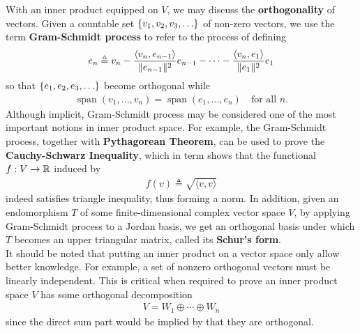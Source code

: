 \documentclass{report}
\begin{document}
With an inner product equipped on $V$, we may discuss the  \textbf{orthogonality} of vectors. Given a countable set  $\set{v_1,v_2,v_3,\dots }$ of non-zero vectors, we use the term \textbf{Gram-Schmidt process} to refer to the process of defining 
\begin{align*}
e_n \triangleq v_n - \frac{\langle v_{n},e_{n-1}\rangle }{\| e_{n-1} \|^2}e_{n-1} - \cdots - \frac{\langle v_n,e_1\rangle }{\| e_1 \|^2}e_1
\end{align*}
so that $\set{e_1,e_2,e_3,\dots}$ become orthogonal while 
\begin{align*}
\operatorname{span}(v_1,\dots ,v_n)=\operatorname{span}(e_1,\dots ,e_n)\quad\text{for all }n.
\end{align*}
Although implicit, Gram-Schmidt process may be considered one of the most important notions in inner product space. For example, the Gram-Schmidt process, together with \textbf{Pythagorean Theorem}, can be used to prove the \textbf{Cauchy-Schwarz Inequality}, which in term shows that the functional $f:V\rightarrow \mathbb{R}$ induced by 
\begin{align*}
f(v)\triangleq \sqrt{\langle v,v\rangle }  
\end{align*}
indeed satisfies triangle inequality, thus forming a norm. In addition, given an endomorphism $T$ of some finite-dimensional complex vector space $V$, by applying Gram-Schmidt process to a Jordan basis, we get an orthogonal basis under which $T$ becomes an upper triangular matrix, called its \textbf{Schur's form}.\\

It should be noted that putting an inner product on a vector space only allow better knowledge. For example, a set of nonzero orthogonal vectors must be linearly independent. This is critical when required to prove an inner product space $V$ has some orthogonal decomposition
\begin{align*}
V= W_1 \oplus \cdots \oplus W_n
\end{align*}
since the direct sum part would be implied by that they are orthogonal.\\
\end{document}
